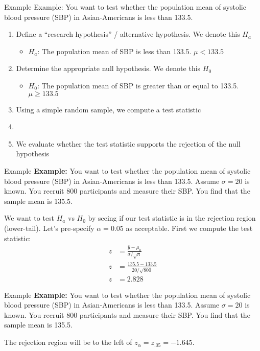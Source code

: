 \documentclass[xcolor=dvipsnames]{beamer}
\begin{document}
\begin{frame}{Example}
	Example: You want to test whether the population mean of systolic blood pressure (SBP) in Asian-Americans is less than 133.5. \\
	\vspace{10 pt}
	\begin{enumerate}
		\item Define a ``research hypothesis'' / alternative hypothesis. We denote this $H_a$
		\begin{itemize}
			\item $H_a$: The population mean of SBP is less than 133.5. $\mu < 133.5$
		\end{itemize}
		\item Determine the appropriate null hypothesis. We denote this $H_0$
		\begin{itemize}
			\item $H_0$: The population mean of SBP is greater than or equal to 133.5. $\mu \geq 133.5$
		\end{itemize}
		\item Using a simple random sample, we compute a test statistic
		\item[]
		\item We evaluate whether the test statistic supports the rejection of the null hypothesis
	\end{enumerate}
\end{frame}

\begin{frame}{Example}
	\textbf{Example:} You want to test whether the population mean of systolic blood pressure (SBP) in Asian-Americans is less than 133.5. Assume $\sigma = 20$ is known. You recruit 800 participants and measure their SBP. You find that the sample mean is 135.5. \\
	\vspace{5pt}
	
	We want to test $H_a$ vs $H_0$ by seeing if our test statistic is in the rejection region (lower-tail). Let's pre-specify $\alpha = 0.05$ as acceptable. First we compute the test statistic:
	\begin{align*}
	z &= \frac{\bar{y} - \mu_0}{\sigma / \sqrt{n}} \\
	z &= \frac{135.5 - 133.5}{20 / \sqrt{800}} \\
	z &= 2.828
	\end{align*}
\end{frame}

\begin{frame}{Example}
	\textbf{Example:} You want to test whether the population mean of systolic blood pressure (SBP) in Asian-Americans is less than 133.5. Assume $\sigma = 20$ is known. You recruit 800 participants and measure their SBP. You find that the sample mean is 135.5. \\
	\vspace{15pt}
	
	The rejection region will be to the left of $z_{\alpha} = z_{.05} = -1.645$.
\end{frame}
\end{document}

